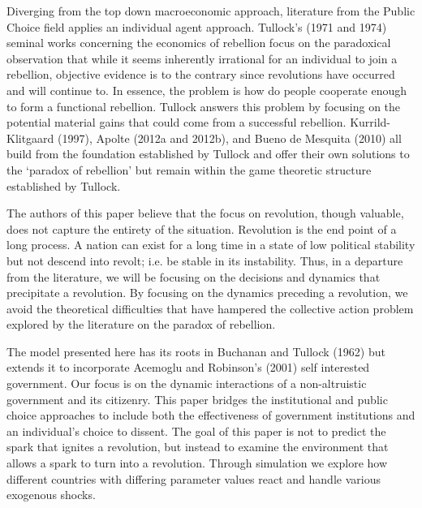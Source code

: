 \documentclass[12pt]{article}
\begin{document}
\begin{spacing}{1.5}
Diverging from the top down macroeconomic approach, literature from the Public Choice field applies an individual agent approach. Tullock's (1971 and 1974) seminal works concerning the economics of rebellion focus on the paradoxical observation that while it seems inherently irrational for an individual to join a rebellion, objective evidence is to the contrary since revolutions have occurred and will continue to. In essence, the problem is how do people cooperate enough to form a functional rebellion. Tullock answers this problem by focusing on the potential material gains that could come from a successful rebellion. Kurrild-Klitgaard (1997), Apolte (2012a and 2012b), and Bueno de Mesquita (2010) all build from the foundation established by Tullock and offer their own solutions to the `paradox of rebellion' but remain within the game theoretic structure established by Tullock. 

The authors of this paper believe that the focus on revolution, though valuable, does not capture the entirety of the situation. Revolution is the end point of a long process. A nation can exist for a long time in a state of low political stability but not descend into revolt; i.e. be stable in its instability. Thus, in a departure from the literature, we will be focusing on the decisions and dynamics that precipitate a revolution. By focusing on the dynamics preceding a revolution, we avoid the theoretical difficulties that have hampered the collective action problem explored by the literature on the paradox of rebellion.  

The model presented here has its roots in Buchanan and Tullock (1962) but extends it to incorporate Acemoglu and Robinson's (2001) self interested government. Our focus is on the dynamic interactions of a non-altruistic government and its citizenry. This paper bridges the institutional and public choice approaches to include both the effectiveness of government institutions and an individual's choice to dissent. The goal of this paper is not to predict the spark that ignites a revolution, but instead to examine the environment that allows a spark to turn into a revolution. Through simulation we explore how different countries with differing parameter values react and handle various exogenous shocks. 



\end{spacing}
\end{document}
